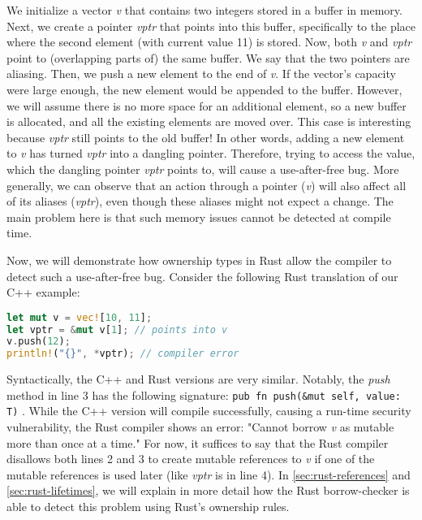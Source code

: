 \documentclass[sigplan,11pt,nonacm]{acmart}
\begin{document}
We initialize a vector \emph{v} that contains two integers stored in a buffer in memory.
Next, we create a pointer \emph{vptr} that points into this buffer, specifically to the place where the second element (with current value 11) is stored.
Now, both \emph{v} and \emph{vptr} point to (overlapping parts of) the same buffer.
We say that the two pointers are aliasing.
Then, we push a new element to the end of \emph{v}.
If the vector's capacity were large enough, the new element would be appended to the buffer.
However, we will assume there is no more space for an additional element, so a new buffer is allocated, and all the existing elements are moved over.
This case is interesting because \emph{vptr} still points to the old buffer!
In other words, adding a new element to \emph{v} has turned \emph{vptr} into a dangling pointer.
Therefore, trying to access the value, which the dangling pointer \emph{vptr} points to, will cause a use-after-free bug.
More generally, we can observe that an action through a pointer (\emph{v}) will also affect all of its aliases (\emph{vptr}), even though these aliases might not expect a change.
The main problem here is that such memory issues cannot be detected at compile time.

Now, we will demonstrate how ownership types in Rust allow the compiler to detect such a use-after-free bug.
Consider the following Rust translation of our C++ example:

\begin{lstlisting}[language=Rust,captionpos=b,caption={Rust use-after-free}]
let mut v = vec![10, 11];
let vptr = &mut v[1]; // points into v
v.push(12);
println!("{}", *vptr); // compiler error
\end{lstlisting}

Syntactically, the C++ and Rust versions are very similar.
Notably, the \emph{push} method in line 3 has the following signature: \verb|pub fn push(&mut self, value: T)| \cite{rust-vector-documentation}.
While the C++ version will compile successfully, causing a run-time security vulnerability, the Rust compiler shows an error: "Cannot borrow \emph{v} as mutable more than once at a time."
For now, it suffices to say that the Rust compiler disallows both lines 2 and 3 to create mutable references to \emph{v} if one of the mutable references is used later (like \emph{vptr} is in line 4).
In \ref{sec:rust-references} and \ref{sec:rust-lifetimes}, we will explain in more detail how the Rust borrow-checker is able to detect this problem using Rust's ownership rules.
\end{document}
